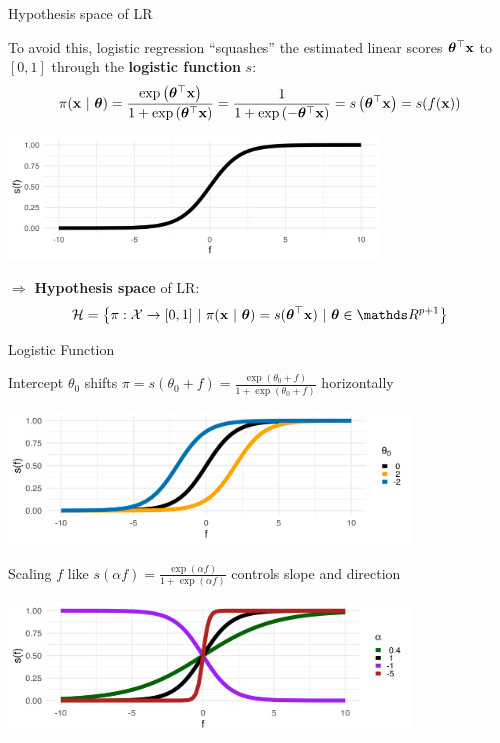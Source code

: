 \documentclass[11pt,compress,t,notes=noshow, xcolor=table]{beamer}
\begin{document}
\begin{vbframe}{Hypothesis space of LR}

To avoid this, logistic regression \enquote{squashes} the estimated linear scores $\bm{\theta}^\top \mathbf{x}$ to $[0,1]$ through the \textbf{logistic function} $s$:
\[
\pi(\mathbf{x}~|~ \bm{\theta}) = \frac{\exp\left( \bm{\theta}^\top \mathbf{x} \right)}{1+\exp\left(\bm{\theta}^\top \mathbf{x} \right)} = \frac{1}{1+\exp\left( -\bm{\theta}^\top \mathbf{x} \right)} = s\left( \bm{\theta}^\top \mathbf{x} \right) = s(f(\mathbf{x}))
\]

\begin{center}
  \includegraphics[width=0.74\textwidth]{figure/logistic_function.png} 
\end{center}

$\Rightarrow$ \textbf{Hypothesis space} of LR:
\begin{eqnarray*}
  \Hspace = \left\{\pi: \Xspace \to [0,1] ~|~\pixt = s(\thx) ~|~ \thetav \in \R^{p+1} \right\}
\end{eqnarray*}

\end{vbframe}

\begin{vbframe}{Logistic Function}

Intercept $\theta_0$ shifts $\pi = s(\theta_0 + f) = \frac{\exp(\theta_0 + f)}{1+\exp(\theta_0 + f)}$ horizontally

{
\centering \includegraphics[width=0.8\textwidth]{figure/logistic_shifted.png}
}

Scaling $f$ like $s(\alpha f) = \frac{\exp(\alpha f)}{1+\exp(\alpha f)}$ controls slope and direction

{
\centering \includegraphics[width=0.8\textwidth]{figure/logistic_scaled.png}
}

\end{vbframe}
\end{document}
